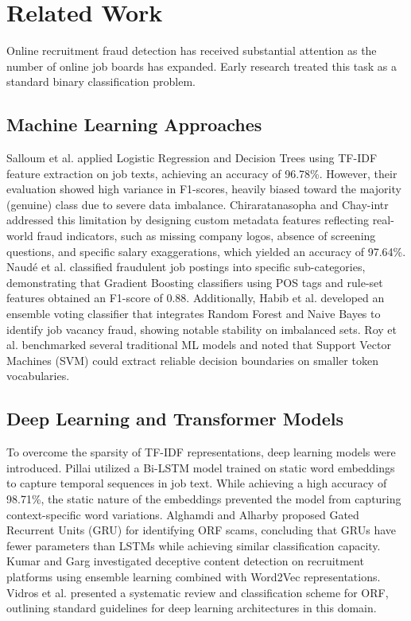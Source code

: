 \documentclass[conference]{IEEEtran}
\begin{document}
\section{Related Work}
Online recruitment fraud detection has received substantial attention as the number of online job boards has expanded. Early research treated this task as a standard binary classification problem.

\subsection{Machine Learning Approaches}
Salloum et al. \cite{salloum2024analysis} applied Logistic Regression and Decision Trees using TF-IDF feature extraction on job texts, achieving an accuracy of 96.78\%. However, their evaluation showed high variance in F1-scores, heavily biased toward the majority (genuine) class due to severe data imbalance. Chiraratanasopha and Chay-intr \cite{chiraratanasopha2022detecting} addressed this limitation by designing custom metadata features reflecting real-world fraud indicators, such as missing company logos, absence of screening questions, and specific salary exaggerations, which yielded an accuracy of 97.64\%. Naud{\'e} et al. \cite{naude2023machine} classified fraudulent job postings into specific sub-categories, demonstrating that Gradient Boosting classifiers using POS tags and rule-set features obtained an F1-score of 0.88. Additionally, Habib et al. \cite{habib2021fake} developed an ensemble voting classifier that integrates Random Forest and Naive Bayes to identify job vacancy fraud, showing notable stability on imbalanced sets. Roy et al. \cite{roy2020fake} benchmarked several traditional ML models and noted that Support Vector Machines (SVM) could extract reliable decision boundaries on smaller token vocabularies.

\subsection{Deep Learning and Transformer Models}
To overcome the sparsity of TF-IDF representations, deep learning models were introduced. Pillai \cite{pillai2023detecting} utilized a Bi-LSTM model trained on static word embeddings to capture temporal sequences in job text. While achieving a high accuracy of 98.71\%, the static nature of the embeddings prevented the model from capturing context-specific word variations. Alghamdi and Alharby \cite{alghamdi2019online} proposed Gated Recurrent Units (GRU) for identifying ORF scams, concluding that GRUs have fewer parameters than LSTMs while achieving similar classification capacity. Kumar and Garg \cite{kumar2022deceptive} investigated deceptive content detection on recruitment platforms using ensemble learning combined with Word2Vec representations. Vidros et al. \cite{vidros2017online} presented a systematic review and classification scheme for ORF, outlining standard guidelines for deep learning architectures in this domain.
\end{document}
